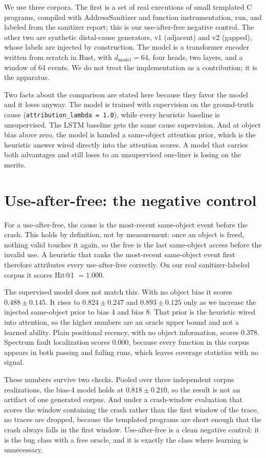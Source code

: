 \documentclass[11pt]{article}
\newcommand{\dmodel}{\ensuremath{d_{\text{model}}}}
\newcommand{\code}[1]{\texttt{#1}}
\begin{document}
We use three corpora. The first is a set of real executions of small templated C programs, compiled with AddressSanitizer and function instrumentation, run, and labeled from the sanitizer report; this is our use-after-free negative control. The other two are synthetic distal-cause generators, v1 (adjacent) and v2 (gapped), whose labels are injected by construction. The model is a transformer encoder written from scratch in Rust, with \dmodel${}=64$, four heads, two layers, and a window of 64 events. We do not treat the implementation as a contribution; it is the apparatus.

Two facts about the comparison are stated here because they favor the model and it loses anyway. The model is trained with supervision on the ground-truth cause (\code{attribution\_lambda = 1.0}), while every heuristic baseline is unsupervised. The LSTM baseline gets the same cause supervision. And at object bias above zero, the model is handed a same-object attention prior, which is the heuristic answer wired directly into the attention scores. A model that carries both advantages and still loses to an unsupervised one-liner is losing on the merits.

\section{Use-after-free: the negative control}

For a use-after-free, the cause is the most-recent same-object event before the crash. This holds by definition, not by measurement: once an object is freed, nothing valid touches it again, so the free is the last same-object access before the invalid use. A heuristic that ranks the most-recent same-object event first therefore attributes every use-after-free correctly. On our real sanitizer-labeled corpus it scores Hit@1 $= 1.000$.

The supervised model does not match this. With no object bias it scores $0.488 \pm 0.145$. It rises to $0.824 \pm 0.247$ and $0.893 \pm 0.125$ only as we increase the injected same-object prior to bias 4 and bias 8. That prior is the heuristic wired into attention, so the higher numbers are an oracle upper bound and not a learned ability. Plain positional recency, with no object information, scores $0.378$. Spectrum fault localization scores $0.000$, because every function in this corpus appears in both passing and failing runs, which leaves coverage statistics with no signal.

These numbers survive two checks. Pooled over three independent corpus realizations, the bias-4 model holds at $0.818 \pm 0.210$, so the result is not an artifact of one generated corpus. And under a crash-window evaluation that scores the window containing the crash rather than the first window of the trace, no traces are dropped, because the templated programs are short enough that the crash always falls in the first window. Use-after-free is a clean negative control: it is the bug class with a free oracle, and it is exactly the class where learning is unnecessary.
\end{document}
